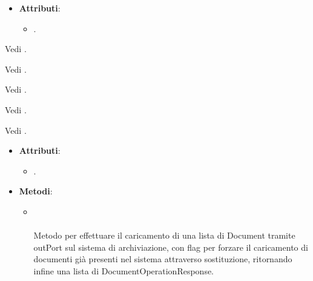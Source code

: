 \documentclass[10pt, a4paper]{article}
\begin{document}
\label{DocumentContentDettaglio}
\begin{itemize}
    \item \textbf{Attributi}:
    \begin{itemize}
        \item {}.
    \end{itemize}
\end{itemize}


Vedi .

Vedi .

Vedi .

Vedi .

Vedi .

\label{DocumentsUploaderDettaglio}
\begin{itemize}
    \item \textbf{Attributi}:
    \begin{itemize}
        \item {}.
    \end{itemize}
    \item \textbf{Metodi}:
    \begin{itemize}
        \item {}\\ \\ 
        Metodo per effettuare il caricamento di una lista di Document tramite outPort sul sistema di archiviazione, con flag per forzare il caricamento di documenti già presenti nel sistema attraverso sostituzione, ritornando infine una lista di DocumentOperationResponse.
    \end{itemize}
\end{itemize}
\end{document}
